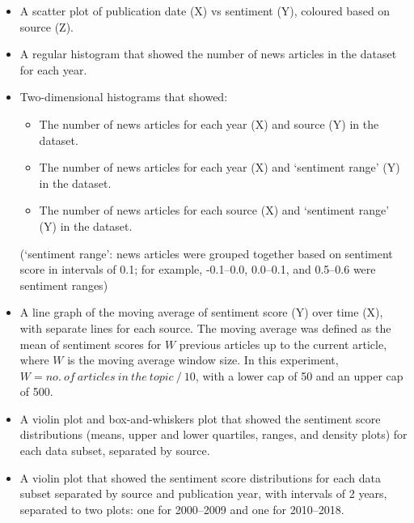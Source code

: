 \documentclass{report}
\begin{document}
\begin{itemize}
	\item A scatter plot of publication date (X) vs sentiment (Y), coloured based on source (Z).
	\item A regular histogram that showed the number of news articles in the dataset for each year.
	\item Two-dimensional histograms that showed:
		\begin{itemize}
			\item The number of news articles for each year (X) and source (Y) in the dataset.
			\item The number of news articles for each year (X) and `sentiment range' (Y) in the dataset.
			\item The number of news articles for each source (X) and `sentiment range' (Y) in the dataset.
		\end{itemize}
		(`sentiment range': news articles were grouped together based on sentiment score in intervals of 0.1; for example, -0.1--0.0, 0.0--0.1, and 0.5--0.6 were sentiment ranges)
	\item A line graph of the moving average of sentiment score (Y) over time (X), with separate lines for each source.
		The moving average was defined as the mean of sentiment scores for $W$ previous articles up to the current article, where $W$ is the moving average window size.
		In this experiment, $W = no. \ of \ articles \ in \ the \ topic \ / \ 10$, with a lower cap of 50 and an upper cap of 500.
	\item A violin plot \cite{hintze1998violin} and box-and-whiskers plot \cite{tukey1977exploratory} that showed the sentiment score distributions (means, upper and lower quartiles, ranges, and density plots) for each data subset, separated by source.
	\item A violin plot that showed the sentiment score distributions for each data subset separated by source and publication year, with intervals of 2 years, separated to two plots: one for 2000--2009 and one for 2010--2018.
\end{itemize}
\end{document}
